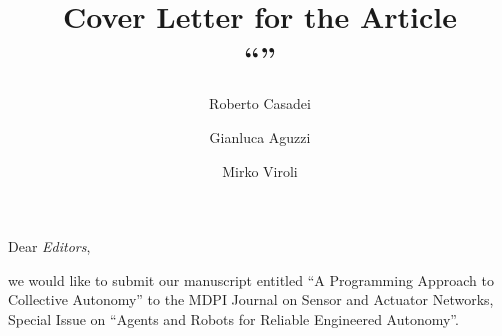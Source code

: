 \documentclass{article}
\title{Cover Letter for the Article\\
``\theTitle''}
\author{Roberto Casadei \and Gianluca Aguzzi \and Mirko Viroli}
\newcommand{\theTitle}{A Programming Approach to Collective Autonomy}
\newcommand{\thePublisher}{MDPI}
\newcommand{\theJournal}{Sensor and Actuator Networks}
\newcommand{\theSI}{Agents and Robots for Reliable Engineered Autonomy}
\begin{document}
\maketitle

Dear \emph{Editors},

we would like to submit our manuscript entitled ``\theTitle{}''
to the \thePublisher{} Journal on \theJournal{}, Special Issue on ``\theSI{}''.



\end{document}
